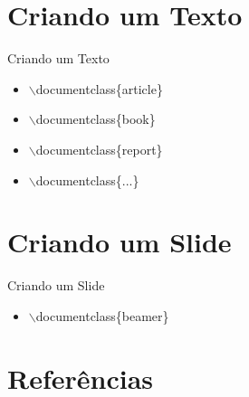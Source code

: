\documentclass{beamer}
\begin{document}
\section{Criando um Texto}
\begin{frame}{Criando um Texto}

	\begin{itemize}
		\item $\backslash$documentclass\{article\}
		\item $\backslash$documentclass\{book\}
		\item $\backslash$documentclass\{report\}
		\item $\backslash$documentclass\{...\}
	\end{itemize}
	

\end{frame}


\section{Criando um Slide}

	\begin{frame}{Criando um Slide}
	
	\begin{itemize}
		\item $\backslash$documentclass\{beamer\}
	\end{itemize}

\end{frame}

\section{Referências}
	
\end{document}
